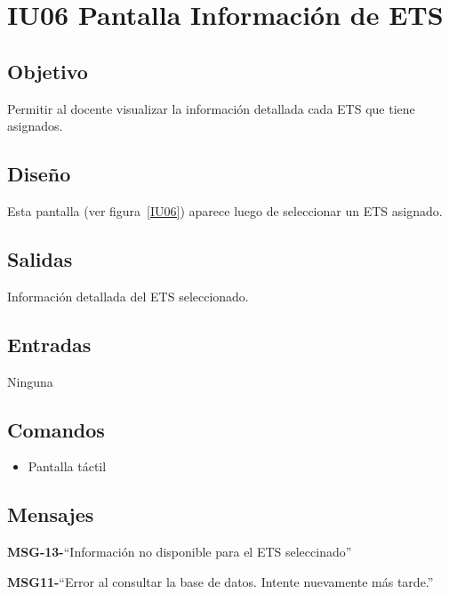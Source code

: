 \section{IU06 Pantalla Información de ETS}

\subsection{Objetivo}
	Permitir al docente visualizar la información detallada cada ETS que tiene asignados.
	
\subsection{Diseño}
	Esta pantalla  (ver figura~\ref{IU06}) aparece luego de seleccionar un ETS asignado. 


\subsection{Salidas}

	Información detallada del ETS seleccionado. 

\subsection{Entradas}
Ninguna

\subsection{Comandos}
\begin{itemize}
	\item Pantalla táctil
\end{itemize}

\subsection{Mensajes}

\begin{Citemize}
	\item {\bf MSG-13-}{``Información no disponible para el ETS seleccinado''}
	\item {\bf MSG11-}{``Error al consultar la base de datos. Intente nuevamente más tarde.''}
\end{Citemize}

